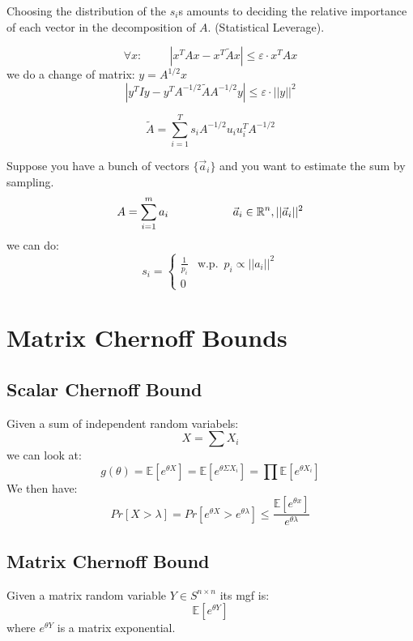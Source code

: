 \documentclass[11pt]{article}
\begin{document}
Choosing the distribution of the $s_i$s amounts to deciding the relative importance of each vector in the decomposition of $A$. (Statistical Leverage).

\[
    \forall x: \hspace{1cm} |x^TAx - x^T\tilde{A}x| \leq \varepsilon \cdot x^TAx
\]
we do a change of matrix: $y = A^{1/2}x$
\[
    |y^TIy - y^TA^{-1/2}\tilde{A} A^{-1/2}y| \leq \varepsilon \cdot ||y||^2
\]

\[
    \tilde{A} = \sum_{i=1}^T s_i A^{-1/2}u_iu_i^TA^{-1/2}
\]

Suppose you have a bunch of vectors $\{\vec{a}_i\}$ and you want to estimate the sum by sampling.
\[
    A =\sum_{i=1}^ma_i \hspace{2cm} \vec{a}_i \in \mathbb{R}^n, ||\vec{a}_i||^2
\]
 we can do:
 \[
    s_i = \begin{cases} \frac{1}{p_i} & \text{w.p. } \,p_i \propto ||a_i||^2\\
    0 
    \end{cases}
 \]
\section*{Matrix Chernoff Bounds}
 \subsection*{Scalar Chernoff Bound} Given a sum of independent random variabels:
 \[
    X = \sum X_i
 \]
 we can look at:
 \[
    g(\theta) = \mathbb{E}[e^{\theta X}] = \mathbb{E}[e^{\theta \Sigma X_i}] = \prod \mathbb{E}[e^{\theta X_i}]
 \]
 We then have:
 \[
    Pr[X > \lambda ] = Pr[e^{\theta X} > e^{\theta\lambda}] \leq \frac{\mathbb{E}[e^{\theta x}]}{e^{\theta \lambda}}
 \]
 \subsection*{Matrix Chernoff Bound}
 Given a matrix random variable $Y \in S^{n \times n}$ its mgf is:
 \[
    \mathbb{E}[e^{\theta Y}]
 \]
 where $e^{\theta Y}$ is a matrix exponential.
\end{document}
